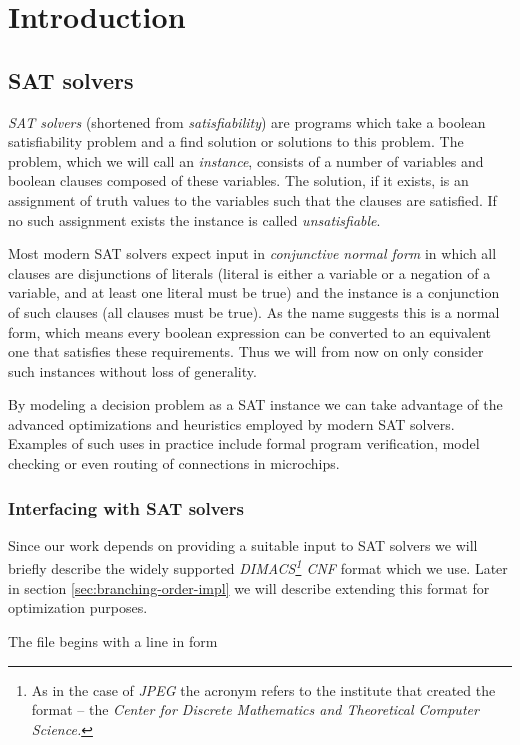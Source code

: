 \section{Introduction}

\subsection{SAT solvers}
\emph{SAT solvers} (shortened from \emph{satisfiability}) are programs which take a boolean satisfiability problem and a find solution or solutions to this problem.
The problem, which we will call an \emph{instance}, consists of a number of variables and boolean clauses composed of these variables.
The solution, if it exists, is an assignment of truth values to the variables such that the clauses are satisfied.
If no such assignment exists the instance is called \emph{unsatisfiable}.

Most modern SAT solvers expect input in \emph{conjunctive normal form} in which all clauses are disjunctions of literals (literal is either a variable or a negation of a variable, and at least one literal must be true) and the instance is a conjunction of such clauses (all clauses must be true).
As the name suggests this is a normal form, which means every boolean expression can be converted to an equivalent one that satisfies these requirements.
Thus we will from now on only consider such instances without loss of generality.

By modeling a decision problem as a SAT instance we can take advantage of the advanced optimizations and heuristics employed by modern SAT solvers.
Examples of such uses in practice include formal program verification, model checking or even routing of connections in microchips.

\subsubsection{Interfacing with SAT solvers}
\label{sec:dimacs}
Since our work depends on providing a suitable input to SAT solvers we will briefly describe the widely supported \emph{DIMACS\footnote{As in the case of \emph{JPEG} the acronym refers to the institute that created the format -- the \emph{Center for Discrete Mathematics and Theoretical Computer Science.}} CNF} format which we use.
Later in section \ref{sec:branching-order-impl} we will describe extending this format for optimization purposes.

The file begins with a line in form

